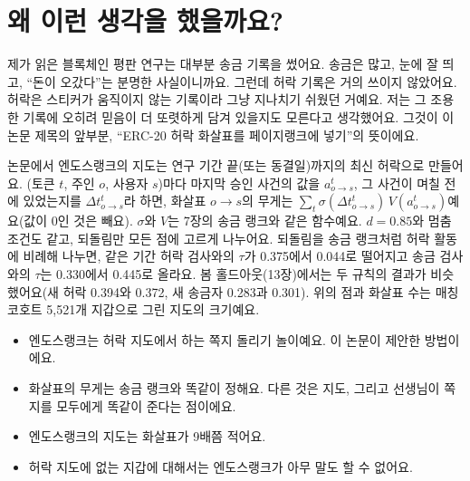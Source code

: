 \section{왜 이런 생각을 했을까요?}

제가 읽은 블록체인 평판 연구는 대부분 송금 기록을 썼어요.
송금은 많고, 눈에 잘 띄고, “돈이 오갔다”는 분명한 사실이니까요.
그런데 허락 기록은 거의 쓰이지 않았어요.
허락은 스티커가 움직이지 않는 기록이라 그냥 지나치기 쉬웠던 거예요.
저는 그 조용한 기록에 오히려 믿음이 더 또렷하게 담겨 있을지도 모른다고 생각했어요.
그것이 이 논문 제목의 앞부분, “ERC-20 허락 화살표를 페이지랭크에 넣기”의 뜻이에요.

\begin{deeper}[진짜 정의]
논문에서 엔도스랭크의 지도는 연구 기간 끝(또는 동결일)까지의 최신 허락으로 만들어요.
(토큰 $t$, 주인 $o$, 사용자 $s$)마다 마지막 승인 사건의 값을 $a^{t}_{o\to s}$, 그 사건이 며칠 전에 있었는지를 $\Delta t^{t}_{o\to s}$라 하면,
화살표 $o \to s$의 무게는 $\sum_t \sigma(\Delta t^{t}_{o\to s})\,V(a^{t}_{o\to s})$예요(값이 0인 것은 빼요).
$\sigma$와 $V$는 7장의 송금 랭크와 같은 함수예요.
$d=0.85$와 멈춤 조건도 같고, 되돌림만 모든 점에 고르게 나누어요.
되돌림을 송금 랭크처럼 허락 활동에 비례해 나누면, 같은 기간 허락 검사와의 $\tau$가 0.375에서 0.044로 떨어지고 송금 검사와의 $\tau$는 0.330에서 0.445로 올라요.
봄 홀드아웃(13장)에서는 두 규칙의 결과가 비슷했어요(새 허락 0.394와 0.372, 새 송금자 0.283과 0.301).
위의 점과 화살표 수는 매칭 코호트 5,521개 지갑으로 그린 지도의 크기예요.
\end{deeper}

\begin{learned}
\begin{itemize}
\item 엔도스랭크는 허락 지도에서 하는 쪽지 돌리기 놀이예요. 이 논문이 제안한 방법이에요.
\item 화살표의 무게는 송금 랭크와 똑같이 정해요. 다른 것은 지도, 그리고 선생님이 쪽지를 모두에게 똑같이 준다는 점이에요.
\item 엔도스랭크의 지도는 화살표가 9배쯤 적어요.
\item 허락 지도에 없는 지갑에 대해서는 엔도스랭크가 아무 말도 할 수 없어요.
\end{itemize}
\end{learned}
